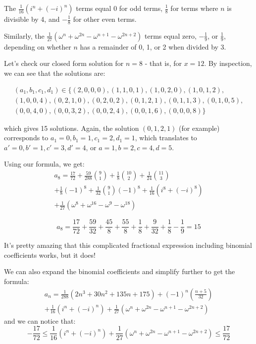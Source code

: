 \documentclass{article}
\begin{document}
The $\frac{1}{16}(i^n + (-i)^n)$ terms equal 0 for odd terms, $\frac{1}{8}$ for terms
where $n$ is divisible by 4, and $-\frac{1}{8}$ for other even terms.

Similarly, the $\frac{1}{27}\left(\omega^{n} + \omega^{2n} - \omega^{n+1} - \omega^{2n+2}\right)$
terms equal zero, $-\frac{1}{9}$, or $\frac{1}{9}$, depending on whether $n$ has a remainder of
0, 1, or 2 when divided by 3.

Let’s check our closed form solution for $n=8$ - that is, for $x=12$. By inspection, we can see
that the solutions are:

\begin{multline*}
(a_1,b_1,c_1,d_1) \in \{(2,0,0,0), (1,1,0,1), (1,0,2,0), (1,0,1,2),\\
(1,0,0,4), (0,2,1,0), (0,2,0,2), (0,1,2,1),(0,1,1,3), (0,1,0,5),\\
(0,0,4,0), (0,0,3,2), (0,0,2,4), (0,0,1,6), (0,0,0,8)\}
\end{multline*}

which gives 15 solutions. Again, the solution $(0,1,2,1)$ (for example) corresponds to
$a_1 = 0, b_1=1, c_1=2, d_1=1$, which translates to $a'=0, b'=1, c'=3, d'=4$, or $a=1, b=2, c=4, d=5$.

Using our formula, we get:
\begin{multline*}
	a_8 = \frac{17}{72} + \frac{59}{288}\binom{9}{1} + \frac{1}{8}\binom{10}{2} + \frac{1}{24}\binom{11}{3} \\
	+ \frac{1}{8}(-1)^8 + \frac{1}{32}\binom{9}{1}(-1)^8 + \frac{1}{16}(i^8 + (-i)^8) \\
	+ \frac{1}{27}\left(\omega^{8} + \omega^{16} - \omega^{9} - \omega^{18}\right)
\end{multline*}

\[a_8 = \frac{17}{72} + \frac{59}{32} + \frac{45}{8} + \frac{55}{8} + \frac{1}{8} + \frac{9}{32} + \frac{1}{8} - \frac{1}{9} = 15 \]

It’s pretty amazing that this complicated fractional expression including binomial
coefficients works, but it does!

We can also expand the binomial coefficients and simplify further to get the formula:
\begin{multline*}
	a_n = \frac{1}{288}(2n^3 + 30n^2 + 135n + 175) + (-1)^n(\frac{n+5}{32}) \\
	+ \frac{1}{16}(i^n + (-i)^n) + \frac{1}{27}\left(\omega^{n} + \omega^{2n} - \omega^{n+1} - \omega^{2n+2}\right)
\end{multline*}
and we can notice that:
\[
	-\frac{17}{72} \leq
	\frac{1}{16}(i^n + (-i)^n) + \frac{1}{27}\left(\omega^{n} + \omega^{2n} - \omega^{n+1} - \omega^{2n+2}\right)
	\leq \frac{17}{72}
\]
\end{document}
